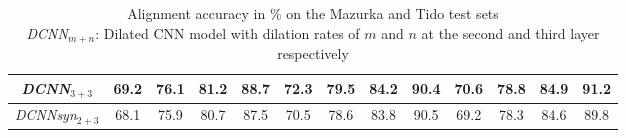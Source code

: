 \documentclass{article}
\begin{document}
\begin{table*}[th]
\begin{adjustbox}{max width=\textwidth}
\begin{tabular}{ccccccccccccc}
\midrule 
     \emph{DCNN}${}_{3+3}$ & 69.2 & 76.1 & 81.2 & 88.7  & 72.3 & 79.5 & 84.2 & 90.4  & 70.6 & 78.8 & 84.9 & 91.2\\
  \midrule
  \emph{DCNNsyn}${}_{2+3}$ & 68.1 & 75.9 & 80.7 & 87.5  & 70.5 & 78.6 & 83.8 & 90.5 & 69.2 & 78.3 & 84.6 & 89.8  \\
\midrule 
\bottomrule
\end{tabular}
\end{adjustbox}
\vspace{0.1cm}
\caption{Alignment accuracy in \% on  the Mazurka and Tido test sets \\ \emph{DCNN}${}_{m+n}$: Dilated CNN model with dilation rates of $m$ and $n$ at the second and third layer respectively \\
}
\vspace{-0.5cm}
\label{results2}
\end{table*}
\vspace{-1.0cm}
\end{document}
